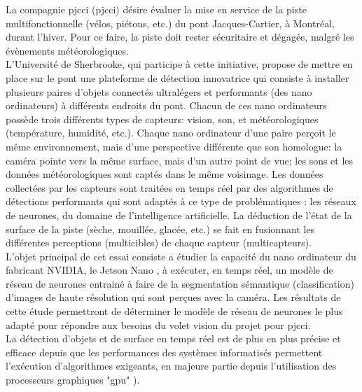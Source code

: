 ﻿\noindent La compagnie \acrlong{pjcci} (\acrshort{pjcci}) désire évaluer la mise en service de la piste multifonctionnelle (vélos, piétons, etc.) du pont Jacques-Cartier, à Montréal, durant l'hiver. Pour ce faire, la piste doit rester sécuritaire et dégagée, malgré les évènements météorologiques.
\vspace{\baselineskip}
\\
\noindent L'Université de Sherbrooke, qui participe à cette initiative, propose de mettre en place sur le pont une plateforme de détection innovatrice qui consiste à installer plusieurs paires d'objets connectés ultralégers et performants (des nano ordinateurs) à différents endroits du pont. Chacun de ces nano ordinateurs possède trois différents types de capteurs: vision, son, et météorologiques (température, humidité, etc.). Chaque nano ordinateur d'une paire perçoit le même environnement, mais d'une perspective différente que son homologue: la caméra pointe vers la même surface, mais d'un autre point de vue; les sons et les données météorologiques sont captés dans le même voisinage. Les données collectées par les capteurs sont traitées en temps réel par des algorithmes de détections performants qui sont adaptés à ce type de problématiques : les réseaux de neurones, du domaine de l'intelligence artificielle. La déduction de l'état de la surface de la piste (sèche, mouillée, glacée, etc.) se fait en fusionnant les différentes perceptions (multicibles) de chaque capteur (multicapteurs).
\vspace{\baselineskip}
\\
\noindent L'objet principal de cet essai consiste a étudier la capacité du nano ordinateur du fabricant NVIDIA, le Jetson Nano \cite{nvidia_jetson_2019}, à exécuter, en temps réel, un modèle de réseau de neurones entrainé à faire de la segmentation sémantique (classification) d'images de haute résolution qui sont perçues avec la caméra. Les résultats de cette étude permettront de déterminer le modèle de réseau de neurones le plus adapté pour répondre aux besoins du volet vision du projet pour \acrshort{pjcci}. 
\vspace{\baselineskip}
\\
\noindent La détection d'objets et de surface en temps réel est de plus en plus précise et efficace depuis que les performances des systèmes informatisés permettent l'exécution d'algorithmes exigeants, en majeure partie depuis l'utilisation des processeurs graphiques "\acrshort{gpu}" \cite{chong_real-time_1992} \cite{dettmers_deep_2015} \cite{beam_deep_2017} \cite{jiaconda_concise_2019} \cite{zheng_real-time_2020} \cite{kurenkov_brief_2015}). 
